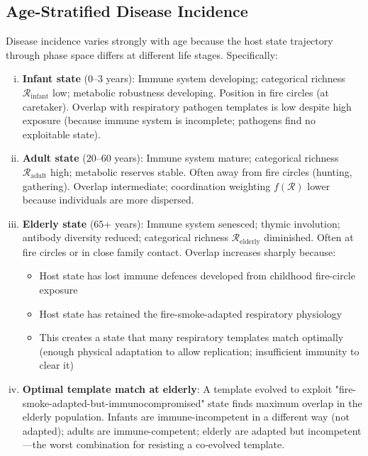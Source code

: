 \documentclass[11pt,twocolumn,a4paper]{article}
\newcommand{\Coord}{\mathcal{R}}
\begin{document}
\subsection{Age-Stratified Disease Incidence}

\begin{theorem}
\label{thm:age_stratified}
Disease incidence varies strongly with age because the host state trajectory through phase space differs at different life stages. Specifically:

\begin{enumerate}[(i)]
\item \textbf{Infant state} ($0$--$3$ years): Immune system developing; categorical richness $\mathcal{R}_{\mathrm{infant}}$ low; metabolic robustness developing. Position in fire circles (at caretaker). Overlap with respiratory pathogen templates is low despite high exposure (because immune system is incomplete; pathogens find no exploitable state).

\item \textbf{Adult state} ($20$--$60$ years): Immune system mature; categorical richness $\mathcal{R}_{\mathrm{adult}}$ high; metabolic reserves stable. Often away from fire circles (hunting, gathering). Overlap intermediate; coordination weighting $f(\Coord)$ lower because individuals are more dispersed.

\item \textbf{Elderly state} ($65$+ years): Immune system senesced; thymic involution; antibody diversity reduced; categorical richness $\mathcal{R}_{\mathrm{elderly}}$ diminished. Often at fire circles or in close family contact. Overlap increases sharply because:
\begin{itemize}
\item Host state has lost immune defences developed from childhood fire-circle exposure
\item Host state has retained the fire-smoke-adapted respiratory physiology
\item This creates a state that many respiratory templates match optimally (enough physical adaptation to allow replication; insufficient immunity to clear it)
\end{itemize}

\item \textbf{Optimal template match at elderly}: A template evolved to exploit "fire-smoke-adapted-but-immunocompromised" state finds maximum overlap in the elderly population. Infants are immune-incompetent in a different way (not adapted); adults are immune-competent; elderly are adapted but incompetent—the worst combination for resisting a co-evolved template.
\end{enumerate}
\end{theorem}
\end{document}
